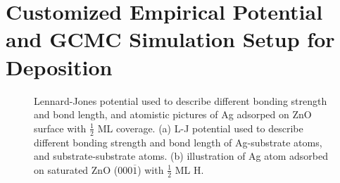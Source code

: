 \section{Customized Empirical Potential and GCMC Simulation Setup for Deposition}

\begingroup
\begin{figure}[!ht]
  \centering
  \caption[Lennard-Jones potential used to describe different bonding strength and bond length, and an atomistic picture of Ag adsorped on ZnO surface with $\frac{1}{2}$ ML coverage.]{Lennard-Jones potential used to describe different bonding strength and bond length, and atomistic pictures of Ag adsorped on ZnO surface with $\frac{1}{2}$ ML coverage. (a) \ac{L-J} potential used to describe different bonding strength and bond length of Ag-substrate atoms, and substrate-substrate atoms. (b) illustration of Ag atom adsorbed on saturated ZnO (000$\overline{1}$) with $\frac{1}{2}$ ML H.}
  \label{Chap:Ag/ZnO:fig2}
\end{figure}
\endgroup

